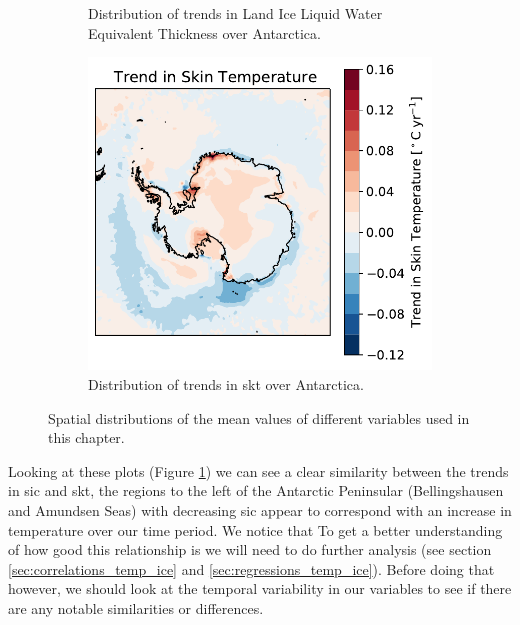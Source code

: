 \documentclass[../main.tex]{subfiles}
\begin{document}
\begin{figure}[ht!]
\begin{subfigure}[ht!]{0.49\textwidth}
\caption{Distribution of trends in Land Ice Liquid Water Equivalent Thickness over Antarctica.}
\end{subfigure}
\begin{subfigure}[ht!]{0.49\textwidth}
\includegraphics[width=\textwidth]{images/week8/hres/trend_skt_distribution}
\caption{Distribution of trends in \gls{skt} over Antarctica.}
\end{subfigure}
\caption{Spatial distributions of the mean values of different variables used in this chapter.}
\label{fig:trend_distributions}
\end{figure}

Looking at these plots (Figure \ref{fig:trend_distributions}) we can see a clear similarity between the trends in \gls{sic} and \gls{skt}, the regions to the left of the Antarctic Peninsular (Bellingshausen and Amundsen Seas) with decreasing \gls{sic} appear to correspond with an increase in temperature over our time period.
We notice that
To get a better understanding of how good this relationship is we will need to do further analysis (see section \ref{sec:correlations_temp_ice} and \ref{sec:regressions_temp_ice}). Before doing that however, we should look at the temporal variability in our variables to see if there are any notable similarities or differences.
\end{document}
